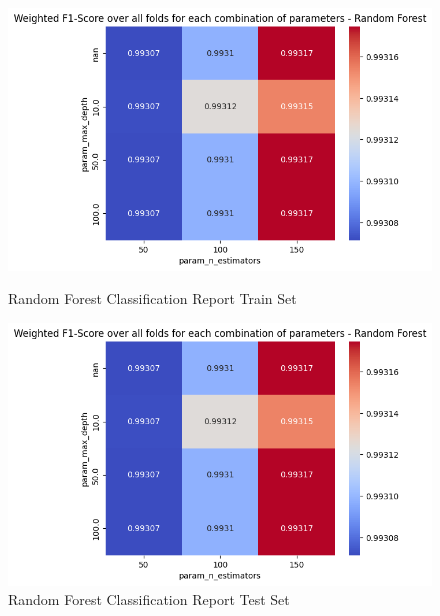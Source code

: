 \begin{figure}[H]
            \vspace{0.5cm}  %

            \begin{minipage}{\textwidth}
                \begin{minipage}[t]{0.48\textwidth}
                    \centering
                    \includegraphics[width=\textwidth]{../figures/plots/section2/weighted_f1_score_for_each_combination_of_parameters_random_forest.png}
                    \caption{Random Forest Classification Report Train Set}
                    \label{fig:}
                \end{minipage}%
                \hfill%
                \begin{minipage}[t]{0.48\textwidth}
                    \centering
                    \includegraphics[width=\textwidth]{../figures/plots/section2/weighted_f1_score_for_each_combination_of_parameters_random_forest.png}
                    \caption{Random Forest Classification Report Test Set}
                    \label{fig:}
                \end{minipage}  
            
            \end{minipage}
            
        \end{figure}
            
